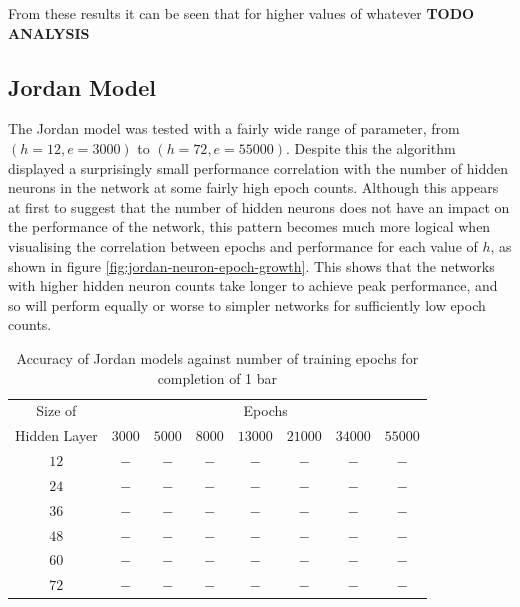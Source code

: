\documentclass[ author={Stephen Livermore-Tozer},
				supervisor={Dr. Peter Flach},
				degree={MEng},
				title={Algorithmic Co-composition Using Machine Learning},
				subtitle={},
				type={research},
				year={2016} ]{dissertation}
\begin{document}
	From these results it can be seen that for higher values of whatever \textbf{TODO ANALYSIS}
	
	\subsection{Jordan Model}
	\label{sec:objective-jordan}
	
	The Jordan model was tested with a fairly wide range of parameter, from $(h = 12, e = 3000)$ to $(h = 72, e = 55000)$. Despite this the algorithm displayed a surprisingly small performance correlation with the number of hidden neurons in the network at some fairly high epoch counts. Although this appears at first to suggest that the number of hidden neurons does not have an impact on the performance of the network, this pattern becomes much more logical when visualising the correlation between epochs and performance for each value of $h$, as shown in figure \ref{fig:jordan-neuron-epoch-growth}. This shows that the networks with higher hidden neuron counts take longer to achieve peak performance, and so will perform equally or worse to simpler networks for sufficiently low epoch counts.
	
	\begin{table}[htp]
		\begin{center}
			\begin{tabular}{cccccccc}
				\toprule
				Size of& \multicolumn{7}{c}{Epochs}\\
				\cline{2-8}
				Hidden Layer& $3000$ & $5000$ & $8000$ & $13000$ & $21000$ & $34000$ & $55000$\\
				\hline
				$12$ & $-$ & $-$ & $-$ & $-$ & $-$ & $-$ & $-$\\
				$24$ & $-$ & $-$ & $-$ & $-$ & $-$ & $-$ & $-$\\
				$36$ & $-$ & $-$ & $-$ & $-$ & $-$ & $-$ & $-$\\
				$48$ & $-$ & $-$ & $-$ & $-$ & $-$ & $-$ & $-$\\
				$60$ & $-$ & $-$ & $-$ & $-$ & $-$ & $-$ & $-$\\
				$72$ & $-$ & $-$ & $-$ & $-$ & $-$ & $-$ & $-$\\
				\bottomrule
			\end{tabular}
		\end{center}
		\caption{Accuracy of Jordan models against number of training epochs for completion of 1 bar}
		\label{tab:jordan-1-bar-results}
	\end{table}
	
\end{document}
